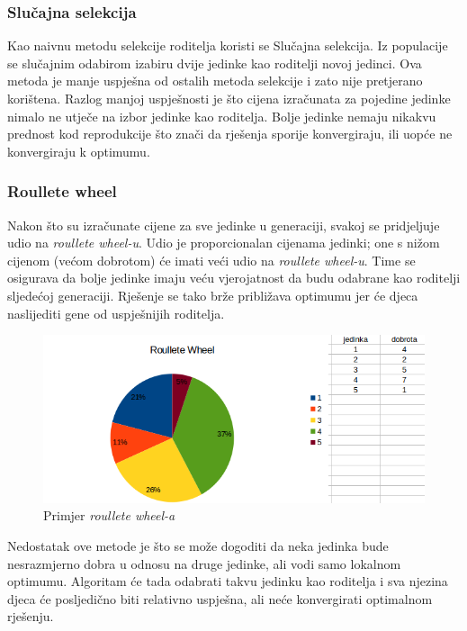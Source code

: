 \documentclass[times, utf8, zavrsni]{fer}
\begin{document}
\subsubsection{Slučajna selekcija}
Kao naivnu metodu selekcije roditelja koristi se Slučajna selekcija. Iz populacije se slučajnim odabirom izabiru dvije jedinke kao roditelji novoj jedinci. Ova metoda je manje uspješna od ostalih metoda selekcije i zato nije pretjerano korištena. Razlog manjoj uspješnosti je što cijena izračunata za pojedine jedinke nimalo ne utječe na izbor jedinke kao roditelja. Bolje jedinke nemaju nikakvu prednost kod reprodukcije što znači da rješenja sporije konvergiraju, ili uopće ne konvergiraju k optimumu.

\subsubsection{Roullete wheel}
Nakon što su izračunate cijene za sve jedinke u generaciji, svakoj se pridjeljuje udio na \textit{roullete wheel-u}. Udio je proporcionalan cijenama jedinki; one s nižom cijenom (većom dobrotom) će imati veći udio na \textit{roullete wheel-u}. Time se osigurava da bolje jedinke imaju veću vjerojatnost da budu odabrane kao roditelji sljedećoj generaciji. Rješenje se tako brže približava optimumu jer će djeca naslijediti gene od uspješnijih roditelja. 

\begin{figure}[htb]
\centering
\includegraphics[width=14cm]{images/roullete_wheel_selection.png}
\caption{Primjer \textit{roullete wheel-a}}
\label{fig:roullete wheel}
\end{figure}

Nedostatak ove metode je što se može dogoditi da neka jedinka bude nesrazmjerno dobra u odnosu na druge jedinke, ali vodi samo lokalnom optimumu. Algoritam će tada odabrati takvu jedinku kao roditelja i sva njezina djeca će posljedično biti relativno uspješna, ali neće konvergirati optimalnom rješenju.
\end{document}
